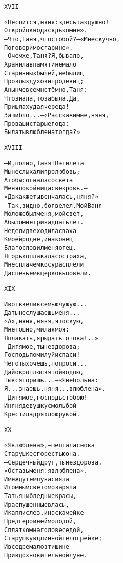 \begin{minipage}[t]{\dimexpr 0.5\textwidth -\tabcolsep-.5pt}
\begin{alltt}\normalfont\centering
XVII

«Не спится, няня: здесь так душно!
Открой окно да сядь ко мне».
— Что, Таня, что с тобой? — «Мне скучно,
Поговорим о старине».
— О чем же, Таня? Я, бывало,
Хранила в памяти не мало
Старинных былей, небылиц
Про злых духов и про девиц;
А нынче все мне тёмно, Таня:
Что знала, то забыла. Да,
Пришла худая череда!
Зашибло... — «Расскажи мне, няня,
Про ваши старые года:
Была ты влюблена тогда?»
\end{alltt}
\end{minipage}

\begin{minipage}[t]{\dimexpr 0.5\textwidth -\tabcolsep-.5pt}
\begin{alltt}\normalfont\centering
XVIII

— И, полно, Таня! В эти лета
Мы не слыхали про любовь;
А то бы согнала со света
Меня покойница свекровь. —
«Да как же ты венчалась, няня?»
— Так, видно, бог велел. Мой Ваня
Моложе был меня, мой свет,
А было мне тринадцать лет.
Недели две ходила сваха
К моей родне, и наконец
Благословил меня отец.
Я горько плакала со страха,
Мне с плачем косу расплели
Да с пеньем в церковь повели.
\end{alltt}
\end{minipage}
\clearpage

\begin{minipage}[t]{\dimexpr 0.5\textwidth -\tabcolsep-.5pt}
\begin{alltt}\normalfont\centering
XIX

И вот ввели в семью чужую...
Да ты не слушаешь меня... —
«Ах, няня, няня, я тоскую,
Мне тошно, милая моя:
Я плакать, я рыдать готова!..»
— Дитя мое, ты нездорова;
Господь помилуй и спаси!
Чего ты хочешь, попроси...
Дай окроплю святой водою,
Ты вся горишь... — «Я не больна:
Я... знаешь, няня... влюблена».
— Дитя мое, господь с тобою! —
И няня девушку с мольбой
Крестила дряхлою рукой.
\end{alltt}
\end{minipage}

\begin{minipage}[t]{\dimexpr 0.5\textwidth -\tabcolsep-.5pt}
\begin{alltt}\normalfont\centering
XX

«Я влюблена», — шептала снова
Старушке с горестью она.
— Сердечный друг, ты нездорова.
«Оставь меня: я влюблена».
И между тем луна сияла
И томным светом озаряла
Татьяны бледные красы,
И распущенные власы,
И капли слез, и на скамейке
Пред героиней молодой,
С платком на голове седой,
Старушку в длинной телогрейке;
И все дремало в тишине
При вдохновительной луне.
\end{alltt}
\end{minipage}
\clearpage

